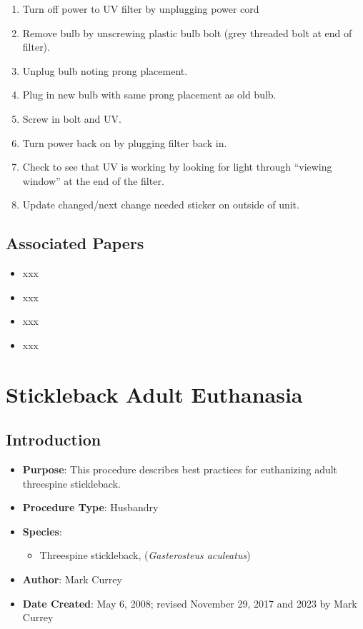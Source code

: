 \documentclass[
  letterpaper,
  DIV=11,
  numbers=noendperiod]{scrreprt}
\providecommand{\tightlist}{%
  \setlength{\itemsep}{0pt}\setlength{\parskip}{0pt}}\usepackage{longtable,booktabs,array}
\begin{document}
\begin{enumerate}
\def\labelenumi{\arabic{enumi}.}
\tightlist
\item
  Turn off power to UV filter by unplugging power cord
\item
  Remove bulb by unscrewing plastic bulb bolt (grey threaded bolt at end
  of filter).
\item
  Unplug bulb noting prong placement.
\item
  Plug in new bulb with same prong placement as old bulb.
\item
  Screw in bolt and UV.
\item
  Turn power back on by plugging filter back in.
\item
  Check to see that UV is working by looking for light through ``viewing
  window'' at the end of the filter.
\item
  Update changed/next change needed sticker on outside of unit.
\end{enumerate}

\hypertarget{associated-papers-24}{%
\section{Associated Papers}\label{associated-papers-24}}

\begin{itemize}
\tightlist
\item
  xxx
\item
  xxx
\item
  xxx
\item
  xxx
\end{itemize}

\hypertarget{sec-husbandry-adutl_sb_euthanasia}{%
\chapter{Stickleback Adult
Euthanasia}\label{sec-husbandry-adutl_sb_euthanasia}}

\hypertarget{introduction-38}{%
\section{Introduction}\label{introduction-38}}

\begin{itemize}
\tightlist
\item
  \textbf{Purpose}: This procedure describes best practices for
  euthanizing adult threespine stickleback.
\item
  \textbf{Procedure Type}: Husbandry
\item
  \textbf{Species}:

  \begin{itemize}
  \tightlist
  \item
    Threespine stickleback, (\emph{Gasterosteus aculeatus})
  \end{itemize}
\item
  \textbf{Author}: Mark Currey
\item
  \textbf{Date Created}: May 6, 2008; revised November 29, 2017 and 2023
  by Mark Currey
\end{itemize}
\end{document}
